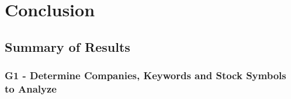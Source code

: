 
\chapter{Conclusion}
\label{c:conclusion}


\section{Summary of Results}
\label{s:conclusions-summary}





\subsection{G1 - Determine Companies, Keywords and Stock Symbols to Analyze}
\label{ss:conclusion-summary-g1}



